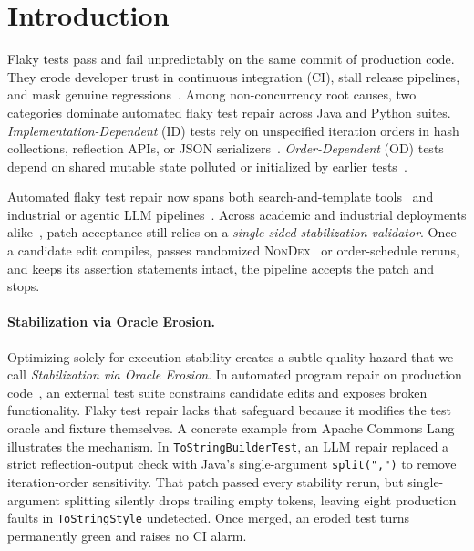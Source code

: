 \section{Introduction}
\label{sec:intro}

Flaky tests pass and fail unpredictably on the same commit of production code. They erode developer trust in continuous integration (CI), stall release pipelines, and mask genuine regressions~\cite{luo2014empirical,parry2021survey}. Among non-concurrency root causes, two categories dominate automated flaky test repair across Java and Python suites. \emph{Implementation-Dependent} (ID) tests rely on unspecified iteration orders in hash collections, reflection APIs, or JSON serializers~\cite{gyori2016nondex}. \emph{Order-Dependent} (OD) tests depend on shared mutable state polluted or initialized by earlier tests~\cite{lam2019idflakies,shi2019ifixflakies,wang2022ipflakies}.

Automated flaky test repair now spans both search-and-template tools~\cite{shi2019ifixflakies,zhang2021dexfix,li2022odrepair,wang2022ipflakies} and industrial or agentic LLM pipelines~\cite{fatima2024flakyfix,chen2024flakydoctor,ke2025niodebugger,li2025flakyguard}. Across academic and industrial deployments alike~\cite{rastenis2026autocover,leunig2026perl}, patch acceptance still relies on a \emph{single-sided stabilization validator}. Once a candidate edit compiles, passes randomized \textsc{NonDex}~\cite{gyori2016nondex} or order-schedule reruns, and keeps its assertion statements intact, the pipeline accepts the patch and stops.

\paragraph{Stabilization via Oracle Erosion.}
Optimizing solely for execution stability creates a subtle quality hazard that we call \emph{Stabilization via Oracle Erosion}. In automated program repair on production code~\cite{qi2015kali,smith2015cure}, an external test suite constrains candidate edits and exposes broken functionality. Flaky test repair lacks that safeguard because it modifies the test oracle and fixture themselves. A concrete example from Apache Commons Lang illustrates the mechanism. In \texttt{ToStringBuilderTest}, an LLM repair replaced a strict reflection-output check with Java's single-argument \texttt{split(",")} to remove iteration-order sensitivity. That patch passed every stability rerun, but single-argument splitting silently drops trailing empty tokens, leaving eight production faults in \texttt{ToStringStyle} undetected. Once merged, an eroded test turns permanently green and raises no CI alarm.

